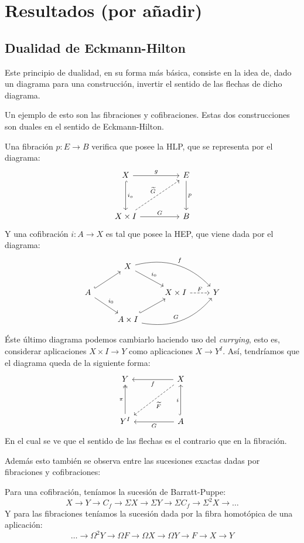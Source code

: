 \chapter{Resultados (por añadir)}
\section{Dualidad de Eckmann-Hilton}
Este principio de dualidad, en su forma más básica, consiste en la idea de, dado un diagrama para una construcción, invertir el sentido de las flechas de dicho diagrama. \par 
Un ejemplo de esto son las fibraciones y cofibraciones. Estas dos construcciones son duales en el sentido de Eckmann-Hilton. \par
Una fibración $p : E \longrightarrow B$ verifica que posee la HLP, que se representa por el diagrama:
\[
\begin{tikzcd}
X \arrow{rr}{g} \arrow[hook]{dd}{i_o} &  & E \arrow{dd}{p} \\
\\
X \times I \arrow{rr}{G} \arrow[dashed]{uurr}{\widetilde{G}} & & B
\end{tikzcd}
\]
Y una cofibración $i : A \longrightarrow X$ es tal que posee la HEP, que viene dada por el diagrama:
\[
\begin{tikzcd}
	{} 						  & X \drar{i_0} \arrow[bend left]{drr}{f}			   &        					&   \\
	A \urar[hook] \drar{i_0}  &   												   & X \times I \rar[dashed]{F} & Y \\
	   						  & A \times I  \urar[hook] \arrow[bend right]{urr}{G} &   							&
\end{tikzcd}
\]
Éste último diagrama podemos cambiarlo haciendo uso del \textit{currying}, esto es, considerar aplicaciones $X \times I \longrightarrow Y$ como aplicaciones $X \longrightarrow Y^I$. Así, tendríamos que el diagrama queda de la siguiente forma:\[
\begin{tikzcd}
Y & & X \arrow{ll}{f} \arrow[dashed]{ddll}{\widetilde{F}} \\
\\
Y^I \arrow[two heads]{uu}{\pi} & & A \arrow[hook]{uu}{i} \arrow{ll}{G}
\end{tikzcd}
\]
En el cual se ve que el sentido de las flechas es el contrario que en la fibración. \par
Además esto también se observa entre las sucesiones exactas dadas por fibraciones y cofibraciones: \par
Para una cofibración, teníamos la sucesión de Barratt-Puppe:
\[ X \longrightarrow Y \longrightarrow C_f \longrightarrow \Sigma X \longrightarrow \Sigma Y \longrightarrow \Sigma C_f \longrightarrow \Sigma^2 X \longrightarrow \dots \]
Y para las fibraciones teníamos la sucesión dada por la fibra homotópica de una aplicación:
\[ \dots \longrightarrow \Omega^2 Y \longrightarrow \Omega F \longrightarrow \Omega X \longrightarrow \Omega Y \longrightarrow F \longrightarrow X \longrightarrow Y \]

